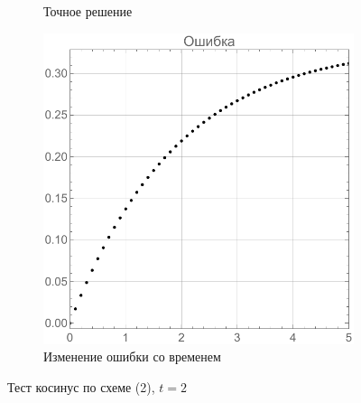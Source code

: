 \documentclass[12pt, a4paper]{article}
\begin{document}
\begin{figure}[!hp]
\begin{subfigure}[t]{0.32\textwidth}
		\caption{Точное решение}
		\label{test2}
	\end{subfigure}
	\hfill
	\begin{subfigure}[t]{0.32\textwidth}
		\centering
		\includegraphics[width=\textwidth]{res1_3}
		\caption{Изменение ошибки со временем}
		\label{test3}
	\end{subfigure}	
	\caption{Тест косинус по схеме (2), $ t = 2$}
\end{figure}
\end{document}
